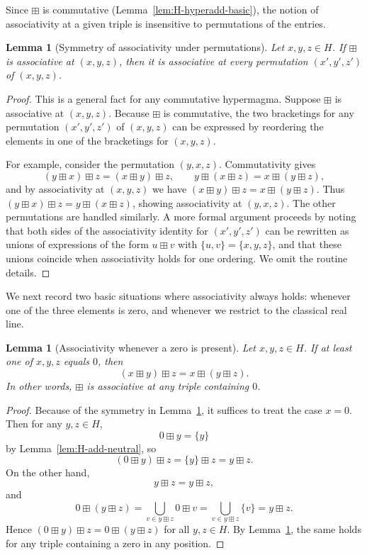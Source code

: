 \documentclass[11pt]{amsart}
\numberwithin{equation}{section}
\newtheorem{lemma}[theorem]{Lemma}
\theoremstyle{definition}
\theoremstyle{remark}
\newcommand{\Hnum}{H}                      %
\newcommand{\op}{\boxplus}                 %
\begin{document}
Since $\op$ is commutative (Lemma~\ref{lem:H-hyperadd-basic}), the
notion of associativity at a given triple is insensitive to
permutations of the entries.

\begin{lemma}[Symmetry of associativity under permutations]
\label{lem:assoc-permutation}
Let $x,y,z\in\Hnum$.  If $\op$ is associative at $(x,y,z)$, then it is
associative at every permutation $(x',y',z')$ of $(x,y,z)$.
\end{lemma}

\begin{proof}
This is a general fact for any commutative hypermagma.  Suppose $\op$
is associative at $(x,y,z)$.  Because $\op$ is commutative, the two
bracketings for any permutation $(x',y',z')$ of $(x,y,z)$ can be
expressed by reordering the elements in one of the bracketings for
$(x,y,z)$.

For example, consider the permutation $(y,x,z)$.  Commutativity gives
\[
  (y\op x)\op z = (x\op y)\op z,
  \qquad
  y\op(x\op z) = x\op(y\op z),
\]
and by associativity at $(x,y,z)$ we have
$(x\op y)\op z = x\op(y\op z)$.  Thus
$(y\op x)\op z = y\op(x\op z)$, showing associativity at $(y,x,z)$.
The other permutations are handled similarly.  A more formal argument
proceeds by noting that both sides of the associativity identity for
$(x',y',z')$ can be rewritten as unions of expressions of the form
$u\op v$ with $\{u,v\}=\{x,y,z\}$, and that these unions coincide when
associativity holds for one ordering.  We omit the routine details.
\end{proof}

We next record two basic situations where associativity always holds:
whenever one of the three elements is zero, and whenever we restrict
to the classical real line.

\begin{lemma}[Associativity whenever a zero is present]
\label{lem:assoc-zero}
Let $x,y,z\in\Hnum$.  If at least one of $x,y,z$ equals $0$, then
\[
  (x\op y)\op z
  = x\op(y\op z).
\]
In other words, $\op$ is associative at any triple containing $0$.
\end{lemma}

\begin{proof}
Because of the symmetry in Lemma~\ref{lem:assoc-permutation}, it
suffices to treat the case $x=0$.  Then for any $y,z\in\Hnum$,
\[
  0\op y = \{y\}
\]
by Lemma~\ref{lem:H-add-neutral}, so
\[
  (0\op y)\op z
  = \{y\}\op z
  = y\op z.
\]
On the other hand,
\[
  y\op z = y\op z,
\]
and
\[
  0\op(y\op z)
  = \bigcup_{v\in y\op z} 0\op v
  = \bigcup_{v\in y\op z} \{v\}
  = y\op z.
\]
Hence $(0\op y)\op z = 0\op(y\op z)$ for all $y,z\in\Hnum$.  By
Lemma~\ref{lem:assoc-permutation}, the same holds for any triple
containing a zero in any position.
\end{proof}
\end{document}
